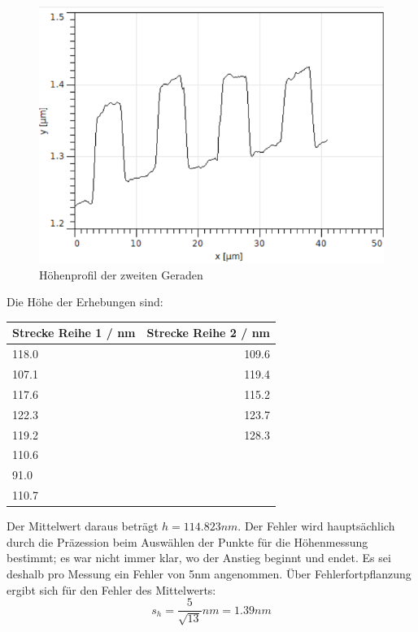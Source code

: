 \begin{figure}[h]
    \centering
    \includegraphics[scale = 0.5]{Bilder/zReihe2.png}
    \caption{Höhenprofil der zweiten Geraden}
    \label{bild:zReihe2}
\end{figure}


Die Höhe der Erhebungen sind: 

\begin{center}
    \centering
    \begin{tabular}{l|r}
        Strecke Reihe 1 /  nm & Strecke Reihe 2 / nm \\
        \hline
        118.0 & 109.6 \\
        107.1 & 119.4 \\
        117.6 & 115.2 \\
        122.3 & 123.7 \\
        119.2 & 128.3 \\
        110.6 & \\
        91.0 & \\
        110.7 & \\
        
    \end{tabular}
\end{center}

Der Mittelwert daraus beträgt $h = 114.823 nm$.
Der Fehler wird hauptsächlich durch die Präzession beim Auswählen der Punkte für die Höhenmessung bestimmt; es war nicht immer klar, 
wo der Anstieg beginnt und endet. Es sei deshalb pro Messung ein Fehler von 5nm angenommen. Über Fehlerfortpflanzung ergibt sich für 
den Fehler des Mittelwerts: 
\begin{equation*}
    s_h = \frac{5}{\sqrt{13}} nm = 1.39 nm
\end{equation*}

